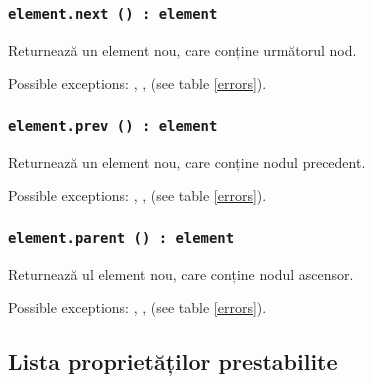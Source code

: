 \subsubsection{\texttt{element.next () : element}}

Returnează un element nou, care conține următorul nod.

Possible exceptions: , ,  (see table \ref{errors}).

\subsubsection{\texttt{element.prev () : element}}

Returnează un element nou, care conține nodul precedent.

Possible exceptions: , ,  (see table \ref{errors}).

\subsubsection{\texttt{element.parent () : element}}

Returnează ul element nou, care conține nodul ascensor.

Possible exceptions: , ,  (see table \ref{errors}).

\subsection{Lista proprietăților prestabilite}
\label{elements:predefined:properties}

